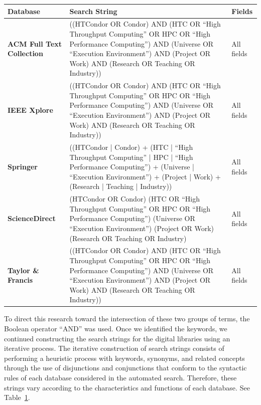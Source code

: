 \begin{table}
	{
		\begin{tabular}{p{2.5cm}p{8cm}p{2.0cm}} \toprule
			\textbf{Database}                        & \textbf{Search String}                                                                                                                                                                                              & \textbf{Fields} \\
			\midrule
			\textbf{ACM Full Text \hbox{Collection}} & ((HTCondor OR Condor) AND (HTC OR ``High Throughput Computing'' OR HPC OR ``High Performance Computing'') AND (Universe OR ``Execution Environment'') AND (Project OR Work) AND (Research OR Teaching OR Industry)) & All fields      \\
			\textbf{IEEE Xplore}                     & ((HTCondor OR Condor) AND (HTC OR ``High Throughput Computing'' OR HPC OR ``High Performance Computing'') AND (Universe OR ``Execution Environment'') AND (Project OR Work) AND (Research OR Teaching OR Industry)) & All fields      \\
			\textbf{Springer}                        & ((HTCondor | Condor) + (HTC | ``High Throughput Computing'' | HPC | ``High Performance Computing'') + (Universe | ``Execution Environment'') + (Project | Work) + (Research | Teaching | Industry))                 & All fields      \\
			\textbf{ScienceDirect}                   & (HTCondor OR Condor) (HTC OR ``High Throughput Computing'' OR HPC OR ``High Performance Computing'') (Universe OR ``Execution Environment'') (Project OR Work) (Research OR Teaching OR Industry)                   & All fields      \\
			\textbf{Taylor \& Francis}               & ((HTCondor OR Condor) AND (HTC OR ``High Throughput Computing'' OR HPC OR ``High Performance Computing'') AND (Universe OR ``Execution Environment'') AND (Project OR Work) AND (Research OR Teaching OR Industry)) & All fields      \\
			\bottomrule
		\end{tabular}}
	\label{table:cadenas_de_busqueda}
\end{table}


To direct this research toward the intersection of these two groups of terms, the Boolean operator ``AND'' was used. Once we identified the keywords, we continued constructing the search strings for the digital libraries using an iterative process. The iterative construction of search strings consists of performing a heuristic process with keywords, synonyms, and related concepts through the use of disjunctions and conjunctions that conform to the syntactic rules of each database considered in the automated search. Therefore, these strings vary according to the characteristics and functions of each database. See Table~\ref{table:cadenas_de_busqueda}.

